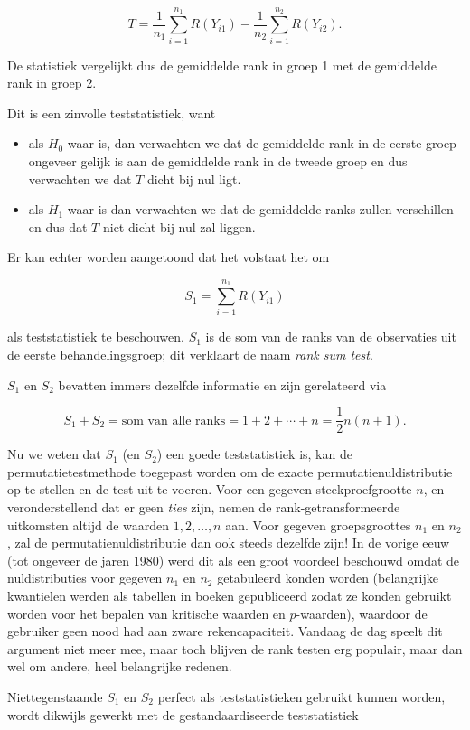 \documentclass[
  12pt,dutch]{book}
\theoremstyle{definition}
\theoremstyle{definition}
\theoremstyle{definition}
\theoremstyle{definition}
\theoremstyle{remark}
\begin{document}
\[
  T = \frac{1}{n_1}\sum_{i=1}^{n_1} R(Y_{i1}) - \frac{1}{n_2}\sum_{i=1}^{n_2} R(Y_{i2}) .
\]

De statistiek vergelijkt dus de gemiddelde rank in groep 1 met de gemiddelde rank in groep 2.

Dit is een zinvolle teststatistiek, want

\begin{itemize}
\item
  als \(H_0\) waar is, dan verwachten we dat de gemiddelde rank in de eerste groep ongeveer gelijk is aan de gemiddelde rank in de tweede groep en dus verwachten we dat \(T\) dicht bij nul ligt.
\item
  als \(H_1\) waar is dan verwachten we dat de gemiddelde ranks zullen verschillen en dus dat \(T\) niet dicht bij nul zal liggen.
\end{itemize}

Er kan echter worden aangetoond dat het volstaat het om

\[S_1=\sum_{i=1}^{n_1} R(Y_{i1})\]

als teststatistiek te beschouwen. \(S_1\) is de som van de ranks van de observaties uit de eerste behandelingsgroep; dit verklaart de naam \emph{rank sum test}.

\(S_1\) en \(S_2\) bevatten immers dezelfde informatie en zijn gerelateerd via

\[
  S_1+S_2 = \text{som van alle ranks} = 1+2+\cdots + n=\frac{1}{2}n(n+1).
\]

Nu we weten dat \(S_1\) (en \(S_2\)) een goede teststatistiek is, kan de permutatietestmethode toegepast worden om de exacte permutatienuldistributie op te stellen en de test uit te voeren.
Voor een gegeven steekproefgrootte \(n\), en veronderstellend dat er geen \emph{ties} zijn, nemen de rank-getransformeerde uitkomsten altijd de waarden \(1, 2, \ldots, n\) aan. Voor gegeven groepsgroottes \(n_1\) en \(n_2\), zal de permutatienuldistributie dan ook steeds dezelfde zijn! In de vorige eeuw (tot ongeveer de jaren 1980) werd dit als een groot voordeel beschouwd omdat de nuldistributies voor gegeven \(n_1\) en \(n_2\) getabuleerd konden worden (belangrijke kwantielen werden als tabellen in boeken gepubliceerd zodat ze konden gebruikt worden voor het bepalen van kritische waarden en \(p\)-waarden), waardoor de gebruiker geen nood had aan zware rekencapaciteit. Vandaag de dag speelt dit argument niet meer mee, maar toch blijven de rank testen erg populair, maar dan wel om andere, heel belangrijke redenen.

Niettegenstaande \(S_1\) en \(S_2\) perfect als teststatistieken gebruikt kunnen worden, wordt dikwijls gewerkt met de gestandaardiseerde teststatistiek
\end{document}
